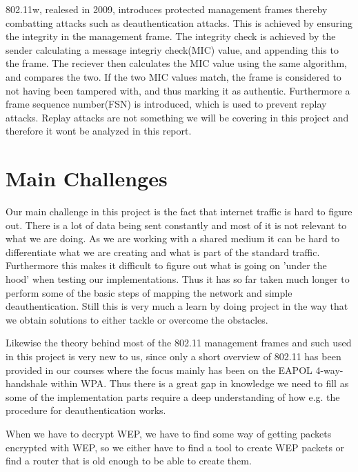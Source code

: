 802.11w, realesed in 2009, introduces protected management frames thereby combatting attacks such as deauthentication attacks. This is achieved by ensuring the integrity in the management frame. The integrity check is achieved by the sender calculating a message integriy check(MIC) value, and appending this to the frame. The reciever then calculates the MIC value using the same algorithm, and compares the two. If the two MIC values match, the frame is considered to not having been tampered with, and thus marking it as authentic. Furthermore a frame sequence number(FSN) is introduced, which is used to prevent replay attacks. Replay attacks are not something we will be covering in this project and therefore it wont be analyzed in this report. 

\section{Main Challenges}
Our main challenge in this project is the fact that internet traffic is hard to figure out. There is a lot of data being sent constantly and most of it is not relevant to what we are doing. As we are working with a shared medium it can be hard to differentiate what we are creating and what is part of the standard traffic. Furthermore this makes it difficult to figure out what is going on 'under the hood' when testing our implementations. Thus it has so far taken much longer to perform some of the basic steps of mapping the network and simple deauthentication. Still this is very much a learn by doing project in the way that we obtain solutions to either tackle or overcome the obstacles.

Likewise the theory behind most of the 802.11 management frames and such used in this project is very new to us, since only a short overview of 802.11 has been provided in our courses where the focus mainly has been on the EAPOL 4-way-handshale within WPA. Thus there is a great gap in knowledge we need to fill as some of the implementation parts require a deep understanding of how e.g. the procedure for deauthentication works. 

When we have to decrypt WEP, we have to find some way of getting packets encrypted with WEP, so we either have to find a tool to create WEP packets or find a router that is old enough to be able to create them. 


